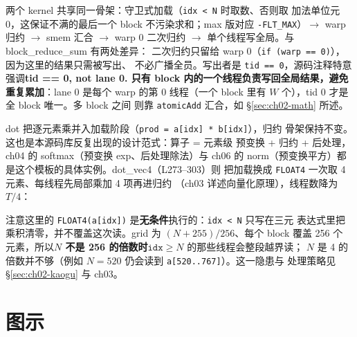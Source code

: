 两个 kernel 共享同一骨架：守卫式加载（\texttt{idx < N} 时取数、否则取
加法单位元 0，这保证不满的最后一个 block 不污染求和；max 版对应
\texttt{-FLT\_MAX}）$\to$ warp 归约 $\to$ smem 汇合 $\to$ warp 0
二次归约 $\to$ 单个线程写全局。与 block\_reduce\_sum 有两处差异：
二次归约只留给 warp 0（\texttt{if (warp == 0)}），因为这里的结果只需被写出、
不必广播全员。写出者是
\texttt{tid == 0}，源码注释特意强调\textbf{tid == 0, not lane 0. 只有 block
内的一个线程负责写回全局结果，避免重复累加}：lane 0 是每个 warp 的第 0
线程（一个 block 里有 $W$ 个），tid 0 才是全 block 唯一。多 block 之间
则靠 \texttt{atomicAdd} 汇合，如 \S\ref{sec:ch02-math} 所述。

dot 把逐元素乘并入加载阶段（\texttt{prod = a[idx] * b[idx]}），归约
骨架保持不变。这也是本源码库反复出现的设计范式：算子 = 元素级
预变换 + 归约 + 后处理，ch04 的 softmax（预变换 exp、后处理除法）与
ch06 的 norm（预变换平方）都是这个模板的具体实例。dot\_vec4（L273--303）则
把加载换成 \texttt{FLOAT4} 一次取 4 元素、每线程先局部乘加 4 项再进归约
（ch03 详述向量化原理），线程数降为 $T/4$：



注意这里的 \texttt{FLOAT4(a[idx])} 是\textbf{无条件}执行的：\texttt{idx < N} 只写在三元
表达式里把乘积清零，并不覆盖这次读。grid 为 $(N+255)/256$、每个 block 覆盖 256 个
元素，所以\textbf{$N$ 不是 256 的倍数时}$\texttt{idx} \ge N$ 的那些线程会整段越界读；
$N$ 是 4 的倍数并不够（例如 $N = 520$ 仍会读到 \texttt{a[520..767]}）。这一隐患与
处理策略见 \S\ref{sec:ch02-kaogu} 与 ch03。

\section{图示}

